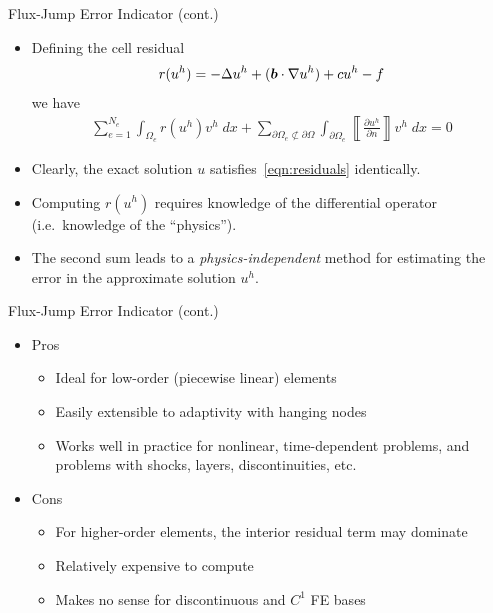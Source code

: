 \begin{frame}{Flux-Jump Error Indicator (cont.)}
  \begin{itemize}
  \item Defining the cell residual
    \begin{equation}
      r(u^h) = -\Delta u^h  + ({\boldsymbol{b}} \cdot \nabla u^h) + cu^h -f
    \end{equation}
    we have
    \begin{eqnarray}
      \label{eqn:residuals}
      \sum_{e=1}^{N_e} \int_{\Omega_e}
      r(u^h) v^h \;  dx +
      \sum_{\partial \Omega_e \not \subset  \partial \Omega}
      \int_{\partial \Omega_e} \left\llbracket \frac{\partial u^h}{\partial n} \right\rrbracket v^h \; dx=0
    \end{eqnarray}

  \item Clearly, the exact solution $u$ satisfies~\eqref{eqn:residuals} identically.

  \item Computing $r(u^h)$ requires
    knowledge of the differential operator (i.e.\ knowledge of the ``physics'').

  \item The second sum leads to a \emph{physics-independent} method for estimating the
    error in the approximate solution $u^h$.

  \end{itemize}
\end{frame}



\begin{frame}{Flux-Jump Error Indicator (cont.)}
\begin{itemize}
  \item Pros
    \begin{itemize}
      \item Ideal for low-order (piecewise linear) elements
      \item Easily extensible to adaptivity with hanging nodes
      \item Works well in practice for nonlinear, time-dependent problems,
	and problems with shocks, layers, discontinuities, etc.
    \end{itemize}

  \item Cons
    \begin{itemize}
    \item For higher-order elements, the interior residual term may dominate
    \item Relatively expensive to compute
    \item Makes no sense for discontinuous and $C^1$ FE bases
    \end{itemize}
\end{itemize}

\end{frame}



